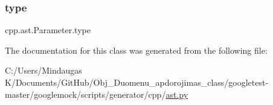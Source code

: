 \subsubsection{\texorpdfstring{type}{type}}
{\footnotesize\ttfamily cpp.\+ast.\+Parameter.\+type}



The documentation for this class was generated from the following file\+:\begin{DoxyCompactItemize}
\item 
C\+:/\+Users/\+Mindaugas K/\+Documents/\+Git\+Hub/\+Obj\+\_\+\+Duomenu\+\_\+apdorojimas\+\_\+class/googletest-\/master/googlemock/scripts/generator/cpp/\mbox{\hyperlink{googletest-master_2googlemock_2scripts_2generator_2cpp_2ast_8py}{ast.\+py}}\end{DoxyCompactItemize}
